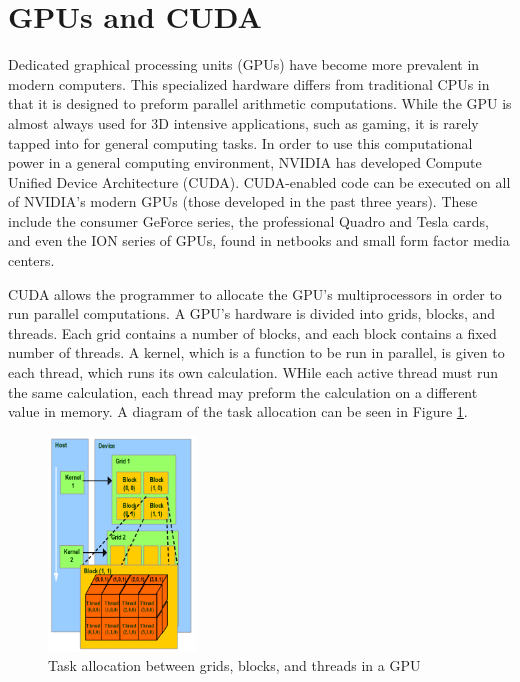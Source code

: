 \documentclass[10pt,twocolumn,twoside]{IEEEtran}
\begin{document}
\section{GPUs and CUDA}
Dedicated graphical processing units (GPUs) have become more prevalent in modern computers. This specialized hardware differs from traditional CPUs in that it is designed to preform parallel arithmetic computations. While the GPU is almost always used for 3D intensive applications, such as gaming, it is rarely tapped into for general computing tasks. In order to use this computational power in a general computing environment, NVIDIA has developed Compute Unified Device Architecture (CUDA). CUDA-enabled code can be executed on all of NVIDIA's modern GPUs (those developed in the past three years). These include the consumer GeForce series, the professional Quadro and Tesla cards, and even the ION series of GPUs, found in netbooks and small form factor media centers.
	
CUDA allows the programmer to allocate the GPU's multiprocessors in order to run parallel computations. A GPU's hardware is divided into grids, blocks, and threads. Each grid contains a number of blocks, and each block contains a fixed number of threads. A kernel, which is a function to be run in parallel, is given to each thread, which runs its own calculation. WHile each active thread must run the same calculation, each thread may preform the calculation on a different value in memory. A diagram of the task allocation can be seen in Figure \ref{fig:cudaBlocks}.

\begin{figure}[h]
\begin{center}
\includegraphics[width=0.35\textwidth]{Images/cudaBlocks.png}
\caption{Task allocation between grids, blocks, and threads in a GPU}
\label{fig:cudaBlocks}
\end{center}
\end{figure}
	
\end{document}
